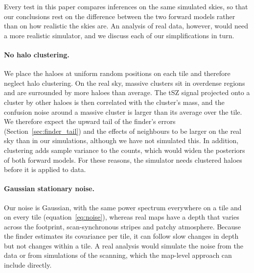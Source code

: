 Every test in this paper compares inferences on the same simulated skies, so that our conclusions rest on
the difference between the two forward models rather than on how realistic the skies are. An analysis of
real data, however, would need a more realistic simulator, and we discuss each of our simplifications in
turn.

\paragraph*{No halo clustering.} We place the haloes at uniform random positions on each tile and
therefore neglect halo clustering. On the real sky, massive clusters sit in overdense regions and are
surrounded by more haloes than average. The tSZ signal projected onto a cluster by other haloes is then
correlated with the cluster's mass, and the confusion noise around a massive cluster is larger than its
average over the tile. We therefore expect the upward tail of the finder's errors
(Section~\ref{sec:finder_tail}) and the effects of neighbours to be larger on the real sky than in our
simulations, although we have not simulated this. In addition, clustering adds sample variance to the counts,
which would widen the posteriors of both forward models. For these reasons, the simulator needs clustered
haloes before it is applied to data.

\paragraph*{Gaussian stationary noise.} Our noise is Gaussian, with the same power spectrum everywhere on a
tile and on every tile (equation~\ref{eq:noise}), whereas real maps have a depth that varies across the
footprint, scan-synchronous stripes and patchy atmosphere. Because the finder estimates its covariance per
tile, it can follow slow changes in depth but not changes within a tile. A real analysis would simulate the
noise from the data or from simulations of the scanning, which the map-level approach can include
directly.

